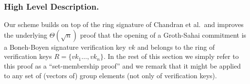 

%
%
%


\subsubsection{High Level Description.} Our scheme builds on top of the ring signature of Chandran et al.~and improves the underlying $\Theta(\sqrt{n})$ proof that the opening of a Groth-Sahai commitment is a Boneh-Boyen signature verification key $vk$ and belongs to the ring of verification keys $R=\{vk_1\ldots,vk_n\}$. In the rest of this section we simply refer to this proof as a ``set-membership proof'' and we remark that it might be applied to any set of (vectors of) group elements (not only of verification keys).

